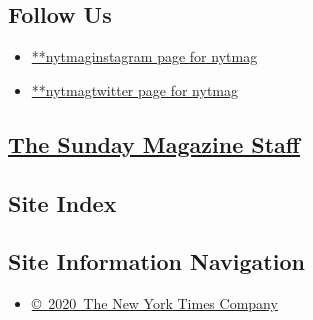 \hypertarget{follow-us}{%
\subsection{Follow Us}\label{follow-us}}

\begin{itemize}
\tightlist
\item
  \href{https://instagram.com/nytmag}{**nytmaginstagram page for nytmag}
\item
  \href{https://twitter.com/nytmag}{**nytmagtwitter page for nytmag}
\end{itemize}

\subsection{}

\hypertarget{the-sunday-magazine-staff}{%
\subsection{\texorpdfstring{\href{\%0Ahttps://www.nytimes.com/interactive/magazine/masthead.html}{The
Sunday Magazine
Staff}}{The Sunday Magazine Staff}}\label{the-sunday-magazine-staff}}

\hypertarget{site-index}{%
\subsection{Site Index}\label{site-index}}

\hypertarget{site-information-navigation}{%
\subsection{Site Information
Navigation}\label{site-information-navigation}}

\begin{itemize}
\tightlist
\item
  \href{https://help.nytimes.com/hc/en-us/articles/115014792127-Copyright-notice}{©~2020~The
  New York Times Company}
\end{itemize}

